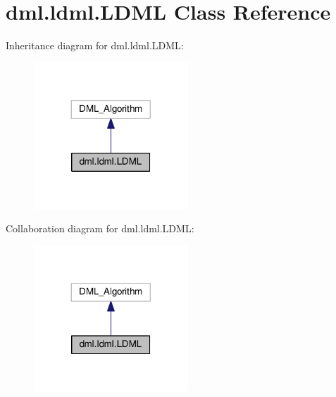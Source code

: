 \hypertarget{classdml_1_1ldml_1_1LDML}{}\section{dml.\+ldml.\+L\+D\+ML Class Reference}
\label{classdml_1_1ldml_1_1LDML}


Inheritance diagram for dml.\+ldml.\+L\+D\+ML\+:
\nopagebreak
\begin{figure}[H]
\begin{center}
\leavevmode
\includegraphics[width=164pt]{classdml_1_1ldml_1_1LDML__inherit__graph}
\end{center}
\end{figure}


Collaboration diagram for dml.\+ldml.\+L\+D\+ML\+:
\nopagebreak
\begin{figure}[H]
\begin{center}
\leavevmode
\includegraphics[width=164pt]{classdml_1_1ldml_1_1LDML__coll__graph}
\end{center}
\end{figure}
